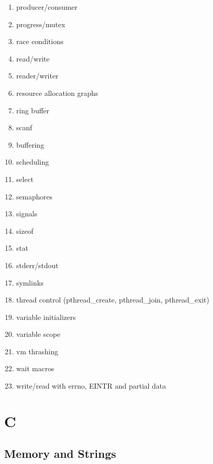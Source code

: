 \begin{enumerate}
\item producer/consumer
\item progress/mutex
\item race conditions
\item read/write
\item reader/writer
\item resource allocation graphs
\item ring buffer
\item scanf
\item buffering
\item scheduling
\item select
\item semaphores
\item signals
\item sizeof
\item stat
\item stderr/stdout
\item symlinks
\item thread control (pthread\_create, pthread\_join, pthread\_exit)
\item variable initializers
\item variable scope
\item vm thrashing
\item wait macros
\item write/read with errno, EINTR and partial data
\end{enumerate}

\section{C}

\subsection{Memory and Strings}

